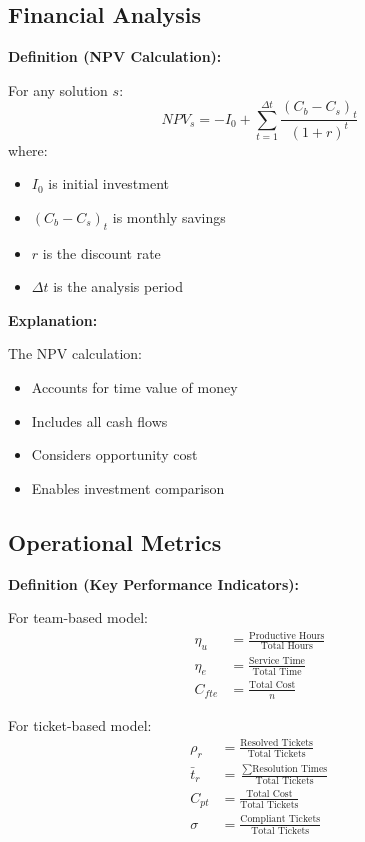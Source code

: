 \documentclass[12pt,a4paper]{article}
\newenvironment{definition}[1]
{\begin{mdframed}[style=definitionstyle]
\textbf{Definition (#1):}\par}
{\end{mdframed}}
\newenvironment{explanation}
{\begin{mdframed}[style=explanationstyle]
\textbf{Explanation:}\par}
{\end{mdframed}}
\begin{document}
\subsection{Financial Analysis}
\begin{definition}{NPV Calculation}
For any solution $s$:
\begin{equation}
    NPV_s = -I_0 + \sum_{t=1}^{\Delta t} \frac{(C_b - C_s)_t}{(1 + r)^t}
\end{equation}
where:
\begin{itemize}
    \item $I_0$ is initial investment
    \item $(C_b - C_s)_t$ is monthly savings
    \item $r$ is the discount rate
    \item $\Delta t$ is the analysis period
\end{itemize}
\end{definition}

\begin{explanation}
The NPV calculation:
\begin{itemize}
    \item Accounts for time value of money
    \item Includes all cash flows
    \item Considers opportunity cost
    \item Enables investment comparison
\end{itemize}
\end{explanation}

\subsection{Operational Metrics}
\begin{definition}{Key Performance Indicators}
For team-based model:
\begin{align*}
    \eta_u &= \frac{\text{Productive Hours}}{\text{Total Hours}} \\
    \eta_e &= \frac{\text{Service Time}}{\text{Total Time}} \\
    C_{fte} &= \frac{\text{Total Cost}}{n}
\end{align*}

For ticket-based model:
\begin{align*}
    \rho_r &= \frac{\text{Resolved Tickets}}{\text{Total Tickets}} \\
    \bar{t}_r &= \frac{\sum \text{Resolution Times}}{\text{Total Tickets}} \\
    C_{pt} &= \frac{\text{Total Cost}}{\text{Total Tickets}} \\
    \sigma &= \frac{\text{Compliant Tickets}}{\text{Total Tickets}}
\end{align*}
\end{definition}
\end{document}
